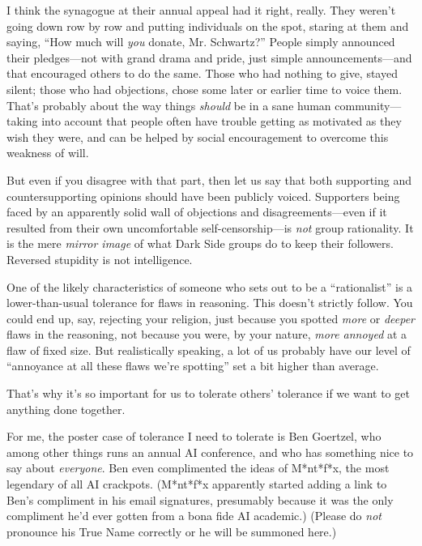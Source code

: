 {
 I think the synagogue at their annual appeal had it right, really.
They weren't going down row by row and putting
individuals on the spot, staring at them and saying,
``How much will \textit{you} donate, Mr.
Schwartz?'' People simply announced their
pledges---not with grand drama and pride, just simple
announcements---and that encouraged others to do the same. Those who
had nothing to give, stayed silent; those who had objections, chose
some later or earlier time to voice them. That's
probably about the way things \textit{should} be in a sane human
community---taking into account that people often have trouble getting
as motivated as they wish they were, and can be helped by social
encouragement to overcome this weakness of will.}

{
 But even if you disagree with that part, then let us say that both
supporting and countersupporting opinions should have been publicly
voiced. Supporters being faced by an apparently solid wall of
objections and disagreements---even if it resulted from their own
uncomfortable self-censorship---is \textit{not} group rationality. It
is the mere \textit{mirror image} of what Dark Side groups do to keep
their followers. Reversed stupidity is not intelligence.}

\myendsectiontext


{
 One of the likely characteristics of someone who sets out to be a
``rationalist'' is a
lower-than-usual tolerance for flaws in reasoning. This
doesn't strictly follow. You could end up, say,
rejecting your religion, just because you spotted \textit{more} or
\textit{deeper} flaws in the reasoning, not because you were, by your
nature, \textit{more annoyed} at a flaw of fixed size. But
realistically speaking, a lot of us probably have our level of
``annoyance at all these flaws we're
spotting'' set a bit higher than average. }

{
 That's why it's so important for
us to tolerate others' tolerance if we want to get
anything done together.}

{
 For me, the poster case of tolerance I need to tolerate is Ben
Goertzel, who among other things runs an annual AI conference, and who
has something nice to say about \textit{everyone}. Ben even
complimented the ideas of M*nt*f*x, the most legendary of all AI
crackpots. (M*nt*f*x apparently started adding a link to
Ben's compliment in his email signatures, presumably
because it was the only compliment he'd ever gotten
from a bona fide AI academic.) (Please do \textit{not} pronounce his
True Name correctly or he will be summoned here.)}

